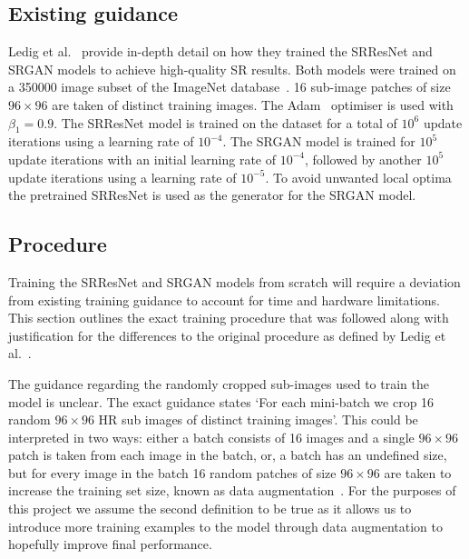 \subsection{Existing guidance}
Ledig et al.~\cite{srgan} provide in-depth detail on how they trained the SRResNet and SRGAN models to achieve high-quality SR results. Both models were trained on a 350000 image subset of the ImageNet database~\cite{imageNet}. 16 sub-image patches of size $96 \times 96$ are taken of distinct training images. The Adam~\cite{adamOptimiser} optimiser is used with $\beta_1 = 0.9$. The SRResNet model is trained on the dataset for a total of $10^6$ update iterations using a learning rate of $10^{-4}$. The SRGAN model is trained for $10^5$ update iterations with an initial learning rate of $10^{-4}$, followed by another $10^5$ update iterations using a learning rate of $10^{-5}$. To avoid unwanted local optima the pretrained SRResNet is used as the generator for the SRGAN model.

\subsection{Procedure}\label{subsec:procedure}
Training the SRResNet and SRGAN models from scratch will require a deviation from existing training guidance to account for time and hardware limitations. This section outlines the exact training procedure that was followed along with justification for the differences to the original procedure as defined by Ledig et al.~\cite{srgan}.

The guidance regarding the randomly cropped sub-images used to train the model is unclear. The exact guidance states `For each mini-batch we crop 16 random $96 \times 96$ HR sub images of distinct training images'. This could be interpreted in two ways: either a batch consists of 16 images and a single $96 \times 96$ patch is taken from each image in the batch, or, a batch has an undefined size, but for every image in the batch 16 random patches of size $96 \times 96$ are taken to increase the training set size, known as data augmentation~\cite{dataAugmentation}. For the purposes of this project we assume the second definition to be true as it allows us to introduce more training examples to the model through data augmentation to hopefully improve final performance.

